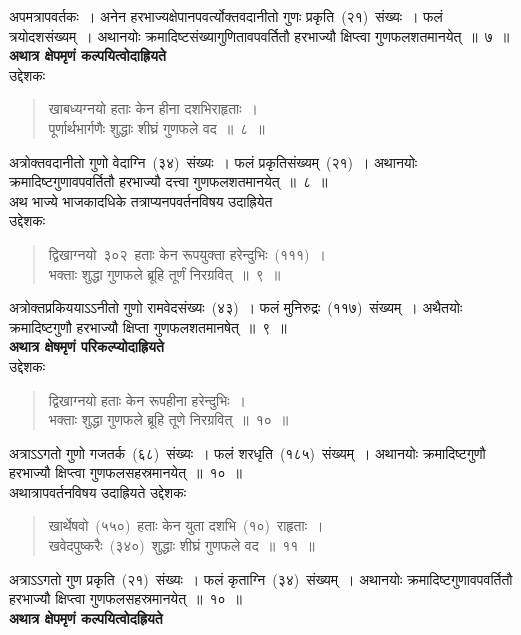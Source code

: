 \documentclass[11pt, openany]{book}
\begin{document}
\newpage
\thispagestyle{fancy}
\fancyhf{}
\noindent
अपमत्रापवर्तकः~। अनेन हरभाज्यक्षेपानपवर्त्योक्तवदानीतो गुणः प्रकृति~(२१)~संख्यः~। फलं त्रयोदशसंख्यम्~। अथानयोः क्रमादिष्टसंख्यागुणितावपवर्तितौ हरभाज्यौ क्षिप्त्वा गुणफलशतमानयेत्~॥~७~॥\\
\indent
\textbf{अथात्र क्षेपमृणं कल्पयित्वोदाह्रियते\textendash}\\
उद्देशकः\textendash
\begin{quote}
{\ku खाबध्यग्नयो हताः केन हीना दशभिराहृताः~।\\
पूर्णार्थभार्गणैः शुद्धाः शीघ्रं गुणफले वद~॥~८~॥}
\end{quote}
\indent
अत्रोक्तवदानीतो गुणो वेदाग्नि~(३४)~संख्यः~। फलं प्रकृतिसंख्यम्~(२१)~। अथानयोः क्रमादिष्टगुणावपवर्तितौ हरभाज्यौ दत्त्वा गुणफलशतमानयेत्~॥~८~॥\\
\indent
अथ भाज्ये भाजकादधिके तत्राप्यनपवर्तनविषय उदाह्रियेत \textendash\\ 
उद्देशकः\textendash 
\begin{quote}
{\ku द्विखाग्नयो~३०२~हताः केन रूपयुक्ता हरेन्दुभिः~(१११)~।\\
भक्ताः शुद्धा गुणफले ब्रूहि तूर्णं निरग्रवित्~॥~९~॥}
\end{quote}

\indent
अत्रोक्तप्रकिययाऽऽनीतो गुणो रामवेदसंख्यः~(४३)~। फलं मुनिरुद्रः~(११७)~संख्यम्~। अथैतयोः क्रमादिष्टगुणौ हरभाज्यौ क्षिप्ता गुणफलशतमानषेत्~॥~९~॥\\
\indent
\textbf{अथात्र क्षेषमृणं परिकल्प्योदाह्रियते\textendash} \\
उद्देशकः\textendash 
\begin{quote}
{\ku द्विखाग्नयो हताः केन रूपहीना हरेन्दुभिः~।\\
भक्ताः शुद्धा गुणफले ब्रूहि तूणे निरग्रवित्~॥~१०~॥}
\end{quote}
\indent
अत्राऽऽगतो गुणो गजतर्क~(६८)~संख्यः~। फलं शरधृति~(१८५)~संख्यम्~। अथानयोः क्रमादिष्टगुणौ हरभाज्यौ क्षिप्त्वा गुणफलसहस्रमानयेत्~॥~१०~॥\\
\indent
अथात्रापवर्तनविषय उदाह्रियते\textendash 
उद्देशकः\textendash 

\begin{quote}
{\ku खार्थेषवो~(५५०)~हताः केन युता दशभि~(१०)~राहृताः~।\\
खवेदपुष्करैः~(३४०)~शुद्धाः शीघ्रं गुणफले वद~॥~११~॥}
\end{quote}

\indent
अत्राऽऽगतो गुण प्रकृति~(२१)~संख्यः~। फलं कृताग्नि~(३४)~संख्यम्~। अथानयोः क्रमादिष्टगुणावपवर्तितौ हरभाज्यौ क्षिप्त्वा गुणफलसहस्रमानयेत्~॥~१०~॥\\
\indent
\textbf{अथात्र क्षेपमृणं कल्पयित्वोदह्रियते\textendash}\\
\end{document}

